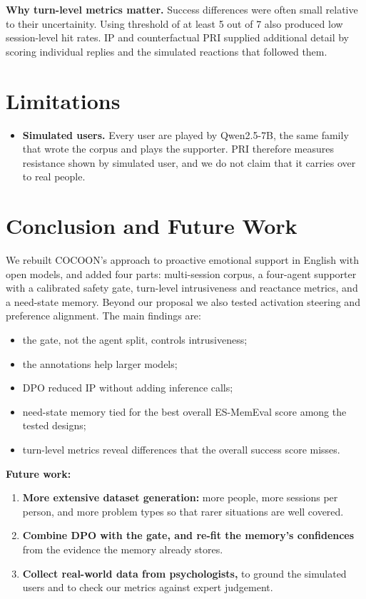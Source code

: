 \documentclass[journal]{IEEEtran}
\begin{document}
\textbf{Why turn-level metrics matter.} Success differences were often small relative to their uncertainity. Using threshold of at least 5 out of 7 also produced low session-level hit rates. IP and counterfactual PRI supplied additional detail by scoring individual replies and the simulated reactions that followed them.

\section{Limitations}
\begin{itemize}
\item \textbf{Simulated users.} Every user are played by Qwen2.5-7B, the same family that wrote the corpus and plays the supporter. PRI therefore measures resistance shown by simulated user, and we do not claim that it carries over to real people.
\end{itemize}

\section{Conclusion and Future Work}\label{sec:conc}
We rebuilt COCOON's approach to proactive emotional support in English with open models, and added four parts: multi-session corpus, a four-agent supporter with a calibrated safety gate, turn-level intrusiveness and reactance metrics, and a need-state memory. Beyond our proposal we also tested activation steering and preference alignment. The main findings are:
\begin{itemize}
\item the gate, not the agent split, controls intrusiveness;
\item the annotations help larger models;
\item DPO reduced IP without adding inference calls;
\item need-state memory tied for the best overall ES-MemEval score among the tested designs;
\item turn-level metrics reveal differences that the overall success score misses.
\end{itemize}

\textbf{Future work:}
\begin{enumerate}
\item \textbf{More extensive dataset generation:} more people, more sessions per person, and more problem types so that rarer situations are well covered.
\item \textbf{Combine DPO with the gate, and re-fit the memory's confidences} from the evidence the memory already stores.
\item \textbf{Collect real-world data from psychologists,} to ground the simulated users and to check our metrics against expert judgement.
\end{enumerate}
\end{document}
